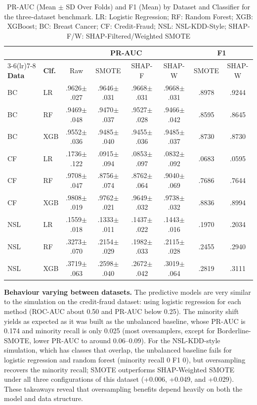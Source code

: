 \documentclass[conference]{IEEEtran}
\begin{document}
\begin{table}[t]
\caption{PR-AUC (Mean $\pm$ SD Over Folds) and F1 (Mean) by Dataset and Classifier for the three-dataset benchmark. LR: Logistic Regression; RF: Random Forest; XGB: XGBoost; BC: Breast Cancer; CF: Credit-Fraud; NSL: NSL-KDD-Style; SHAP-F/W: SHAP-Filtered/Weighted SMOTE}
\label{tab:cfg}
\centering
\small
\begin{tabular}{llcccccc}
\toprule
 & & \multicolumn{4}{c}{\textbf{PR-AUC}} & \multicolumn{2}{c}{\textbf{F1}} \\
\cmidrule(lr){3-6}\cmidrule(lr){7-8}
\textbf{Data} & \textbf{Clf.} & Raw & SMOTE & SHAP-F & SHAP-W & SMOTE & SHAP-W \\
\midrule
BC & LR & .9626$\pm$.027 & .9646$\pm$.031 & .9668$\pm$.031 & .9668$\pm$.031 & .8978 & .9244 \\
BC & RF & .9469$\pm$.048 & .9470$\pm$.037 & .9527$\pm$.028 & .9466$\pm$.042 & .8595 & .8645 \\
BC & XGB & .9552$\pm$.036 & .9485$\pm$.040 & .9455$\pm$.036 & .9485$\pm$.037 & .8730 & .8730 \\
CF & LR & .1736$\pm$.122 & .0915$\pm$.094 & .0853$\pm$.097 & .0832$\pm$.092 & .0683 & .0595 \\
CF & RF & .9708$\pm$.047 & .8756$\pm$.074 & .8762$\pm$.064 & .9040$\pm$.069 & .7686 & .7644 \\
CF & XGB & .9808$\pm$.019 & .9762$\pm$.021 & .9649$\pm$.032 & .9738$\pm$.032 & .8836 & .8994 \\
NSL & LR & .1559$\pm$.018 & .1333$\pm$.011 & .1437$\pm$.022 & .1443$\pm$.016 & .1970 & .2034 \\
NSL & RF & .3273$\pm$.070 & .2154$\pm$.029 & .1982$\pm$.033 & .2115$\pm$.028 & .2455 & .2940 \\
NSL & XGB & .3719$\pm$.063 & .2598$\pm$.040 & .2672$\pm$.042 & .3019$\pm$.064 & .2819 & .3111 \\
\bottomrule
\end{tabular}
\end{table}



\textbf{Behaviour varying between datasets.} The predictive models are very similar to the simulation on the credit-fraud dataset: using logistic regression for each method (ROC-AUC about 0.50 and PR-AUC below 0.25). The minority shift yields as expected as it was built as the unbalanced baseline, whose PR-AUC is 0.174 and minority recall is only 0.025 (most oversamplers, except for Borderline-SMOTE, lower PR-AUC to around 0.06--0.09). For the NSL-KDD-style simulation, which has classes that overlap, the unbalanced baseline fails for logistic regression and random forest (minority recall 0 F1 0), but oversampling recovers the minority recall; SMOTE outperforms SHAP-Weighted SMOTE under all three configurations of this dataset (+0.006, +0.049, and +0.029). These takeaways reveal that oversampling benefits depend heavily on both the model and data structure.
\end{document}
